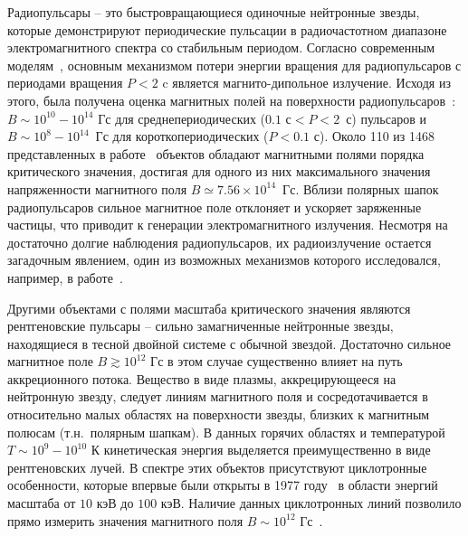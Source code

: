 Радиопульсары -- это быстровращающиеся одиночные нейтронные 
звезды, которые демонстрируют периодические пульсации в радиочастотном 
диапазоне электромагнитного спектра со стабильным периодом. Согласно 
современным моделям~\cite{Gunn:1969,Pacini:1970}, основным механизмом потери 
энергии вращения для радиопульсаров с периодами вращения $P<2$ c является 
магнито-дипольное излучение. Исходя из этого, была получена оценка магнитных 
полей на поверхности радиопульсаров~\cite{Kim:2023}: $B\sim 10^{10}-10^{14}$ Гс 
для среднепериодических ($0.1\text{ с}<P<2$~с) пульсаров и 
$B\sim10^8-10^{14}$~Гс для короткопериодических ($P<0.1$ с). Около 110 из 1468 
представленных в работе~\cite{Kim:2023} объектов обладают магнитными полями 
порядка критического значения, достигая для одного из них максимального 
значения напряженности магнитного поля $B\simeq7.56 \times 10^{14}$~Гс. Вблизи 
полярных шапок радиопульсаров сильное магнитное поле отклоняет и ускоряет 
заряженные частицы, что приводит к генерации электромагнитного излучения.    
Несмотря на достаточно долгие наблюдения радиопульсаров, их радиоизлучение 
остается загадочным явлением, один из возможных механизмов которого 
исследовался, например, в работе~\cite{Philippov_2020}.
	
Другими объектами с полями масштаба критического значения 
являются рентгеновские пульсары -- сильно замагниченные нейтронные звезды, 
находящиеся в тесной двойной системе с обычной звездой. Достаточно сильное 
магнитное поле $B\gtrsim10^{12}$ Гс в этом случае существенно влияет на путь 
аккреционного потока. Вещество в виде плазмы, аккрецирующееся на нейтронную 
звезду, следует линиям магнитного поля и сосредотачивается в относительно малых 
областях на поверхности звезды, близких к магнитным полюсам (т.н.~полярным 
шапкам). В данных горячих областях и температурой $T\sim10^9-10^{10}$ К кинетическая энергия 
выделяется преимущественно в виде рентгеновских лучей. В спектре этих объектов 
присутствуют циклотронные особенности, которые впервые были открыты в 1977 
году~\cite{Trumper:1977} в области энергий масштаба от $10$ кэВ до $100$ кэВ. Наличие данных циклотронных линий позволило прямо измерить 
значения магнитного поля $B\sim10^{12}$ Гс~\cite{Staubert:2019}.
 

